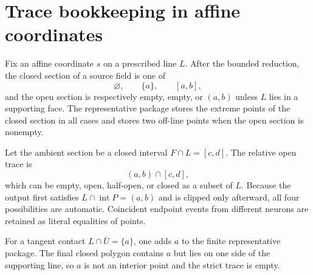 \section{Trace bookkeeping in affine coordinates}\label{app:traces}

Fix an affine coordinate $s$ on a prescribed line $L$.  After the bounded
reduction, the closed section of a source field is one of
\[
 \varnothing,
 \qquad \{a\},
 \qquad [a,b],
\]
and the open section is respectively empty, empty, or $(a,b)$ unless $L$
lies in a supporting face.  The representative package stores the extreme
points of the closed section in all cases and stores two off-line points when
the open section is nonempty.

Let the ambient section be a closed interval $F\cap L=[c,d]$.  The relative
open trace is
\[
 (a,b)\cap[c,d],
\]
which can be empty, open, half-open, or closed as a subset of $L$.  Because
the output first satisfies $L\cap\operatorname{int}P=(a,b)$ and is clipped
only afterward, all four possibilities are automatic.  Coincident endpoint
events from different neurons are retained as literal equalities of points.

For a tangent contact $L\cap\overline U=\{a\}$, one adds $a$ to the finite
representative package.  The final closed polygon contains $a$ but lies on
one side of the supporting line, so $a$ is not an interior point and the
strict trace is empty.
